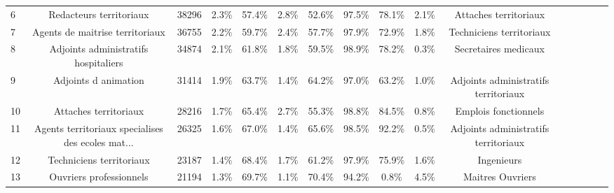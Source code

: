 \documentclass[10pt]{article}
\begin{document}
\begin{landscape}
\begin{longtable}{ | p{0.5cm} |*{15}{c|} }
6   &                            Redacteurs territoriaux &          38296 &           2.3\% &                  57.4\% &                 2.8\% &                    52.6\% &              97.5\% &                             78.1\% &                                     2.1\% &                              Attaches territoriaux \\
7   &                    Agents de maitrise territoriaux &          36755 &           2.2\% &                  59.7\% &                 2.4\% &                    57.7\% &              97.9\% &                             72.9\% &                                     1.8\% &                           Techniciens territoriaux \\
8   &               Adjoints administratifs hospitaliers &          34874 &           2.1\% &                  61.8\% &                 1.8\% &                    59.5\% &              98.9\% &                             78.2\% &                                     0.3\% &                               Secretaires medicaux \\
9   &                               Adjoints d animation &          31414 &           1.9\% &                  63.7\% &                 1.4\% &                    64.2\% &              97.0\% &                             63.2\% &                                     1.0\% &               Adjoints administratifs territoriaux \\
10  &                              Attaches territoriaux &          28216 &           1.7\% &                  65.4\% &                 2.7\% &                    55.3\% &              98.8\% &                             84.5\% &                                     0.8\% &                               Emplois fonctionnels \\
11  &  Agents territoriaux specialises des ecoles mat... &          26325 &           1.6\% &                  67.0\% &                 1.4\% &                    65.6\% &              98.5\% &                             92.2\% &                                     0.5\% &               Adjoints administratifs territoriaux \\
12  &                           Techniciens territoriaux &          23187 &           1.4\% &                  68.4\% &                 1.7\% &                    61.2\% &              97.9\% &                             75.9\% &                                     1.6\% &                                         Ingenieurs \\
13  &                            Ouvriers professionnels &          21194 &           1.3\% &                  69.7\% &                 1.1\% &                    70.4\% &              94.2\% &                              0.8\% &                                     4.5\% &                                   Maitres Ouvriers \\

\end{longtable}
\end{landscape}
\end{document}
